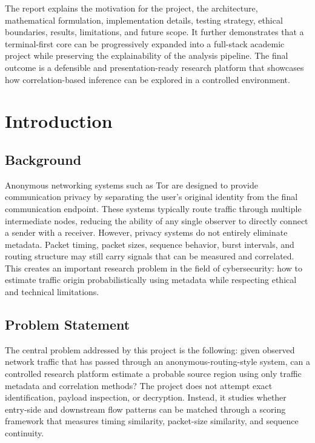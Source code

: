 \documentclass[12pt,a4paper]{report}
\begin{document}
The report explains the motivation for the project, the architecture, mathematical formulation, implementation details, testing strategy, ethical boundaries, results, limitations, and future scope. It further demonstrates that a terminal-first core can be progressively expanded into a full-stack academic project while preserving the explainability of the analysis pipeline. The final outcome is a defensible and presentation-ready research platform that showcases how correlation-based inference can be explored in a controlled environment.

\chapter{Introduction}
\section{Background}
Anonymous networking systems such as Tor are designed to provide communication privacy by separating the user's original identity from the final communication endpoint. These systems typically route traffic through multiple intermediate nodes, reducing the ability of any single observer to directly connect a sender with a receiver. However, privacy systems do not entirely eliminate metadata. Packet timing, packet sizes, sequence behavior, burst intervals, and routing structure may still carry signals that can be measured and correlated. This creates an important research problem in the field of cybersecurity: how to estimate traffic origin probabilistically using metadata while respecting ethical and technical limitations.

\section{Problem Statement}
The central problem addressed by this project is the following: given observed network traffic that has passed through an anonymous-routing-style system, can a controlled research platform estimate a probable source region using only traffic metadata and correlation methods? The project does not attempt exact identification, payload inspection, or decryption. Instead, it studies whether entry-side and downstream flow patterns can be matched through a scoring framework that measures timing similarity, packet-size similarity, and sequence continuity.
\end{document}
